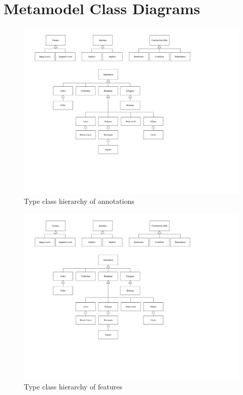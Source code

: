 \chapter{Metamodel Class Diagrams}
\label{ch:metamodel_class_diagrams}

\begin{figure}[p]
  \centering
  \includegraphics{images/class_diagrams/annotation}
  \caption{Type class hierarchy of annotations}
  \label{fig:metamodel_class_diagrams:annotation}  
\end{figure}

\clearpage

\begin{figure}[p]
  \centering
  \includegraphics{images/class_diagrams/feature}
  \caption{Type class hierarchy of features}
  \label{fig:metamodel_class_diagrams:feature}   
\end{figure}

